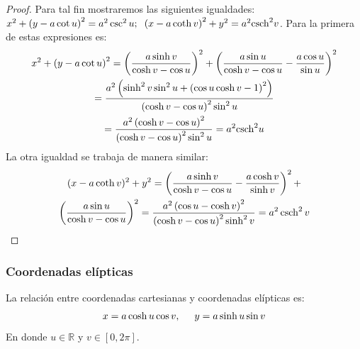 \begin{proof}
Para tal fin mostraremos las siguientes igualdades:
$x^2+\left( y-a\cot u\right) ^2=a^2\csc ^2u;\hskip0.2cm  \left( x-a\coth v\right) ^2+y^2=a^2{\rm csch}^2v$.
Para la primera de estas expresiones es:
{\small
\begin{multline}
\label{bipolares1}
x^2+\left( y-a\cot u\right) ^2 =  \left( \frac{a\sinh v}{\cosh v-\cos u}\right) ^2+\left( \frac{a\sin u}{\cosh v-\cos u}-\frac{a\cos u}{\sin u}\right) ^2  \\
=  \frac{a^2\left( \sinh ^2v\sin ^2u+\left( \cos u\cosh v-1\right) ^2\right)}{\left( \cosh v-\cos u\right) ^2\sin ^2u}   \\
=  \frac{a^2\left( \cosh v-\cos u\right) ^2 }{\left( \cosh v-\cos u\right) ^2\sin ^2u} = %
a^2{\rm csch}^2u
\end{multline}
}
La otra igualdad se trabaja de manera similar:
\begin{multline} \label{bipolares2}
(x-a\coth v) ^2+y^2 = \left( \frac{a\sinh v}{\cosh v-\cos u}-\frac{a\cosh v}{\sinh v}\right) ^2+ \\ \left( \frac{a\sin u}{\cosh v-\cos u}\right) ^2
= \frac{a^2\left( \cos u-\cosh v\right) ^2}{\left( \cosh v-\cos u\right) ^2\sinh ^2v}  %
= a^2\csch^2v
\end{multline}
\end{proof}

\subsubsection{Coordenadas elípticas} 
La relación entre coordenadas cartesianas y coordenadas elípticas es:
\begin{equation}
x = a \cosh u\cos v,\hskip0.5cm y = a \sinh u \sin v
\end{equation}
En donde $u \in \mathbb{R}$ y $v \in [0, 2\pi]$.

